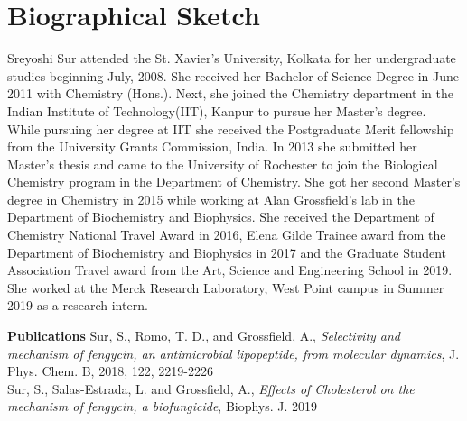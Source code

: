 \section*{Biographical Sketch}

Sreyoshi Sur attended the St. Xavier's University, Kolkata for her undergraduate 
studies beginning July, 2008. She received her Bachelor of Science Degree in June 
2011 with Chemistry (Hons.). Next, she joined the Chemistry department in the Indian 
Institute of Technology(IIT), Kanpur to pursue her Master's degree. While pursuing 
her degree at IIT she received the Postgraduate Merit fellowship from the University 
Grants Commission, India. In 2013 she submitted her Master's thesis and came to the 
University of Rochester to join the Biological Chemistry program in the Department of
Chemistry. She got her second Master's degree in Chemistry in 2015 while working at Alan Grossfield's lab in the Department of Biochemistry and Biophysics. She received the Department of Chemistry National Travel Award in 2016, Elena Gilde Trainee award from the Department of Biochemistry and Biophysics in 2017 and the Graduate Student Association Travel award from the Art, Science and Engineering School in 2019. She worked at the Merck Research Laboratory, West Point campus in Summer 2019 as a research intern.

\noindent \textbf{Publications}
Sur, S., Romo, T. D., and Grossfield, A., 
\emph{Selectivity and mechanism of fengycin, an antimicrobial lipopeptide, from molecular dynamics}, J. Phys. Chem. B, 2018, 122, 2219-2226\\
Sur, S., Salas-Estrada, L. and Grossfield, A.,
\emph{Effects of Cholesterol on the mechanism of fengycin, a biofungicide},
Biophys. J. 2019

\newpage